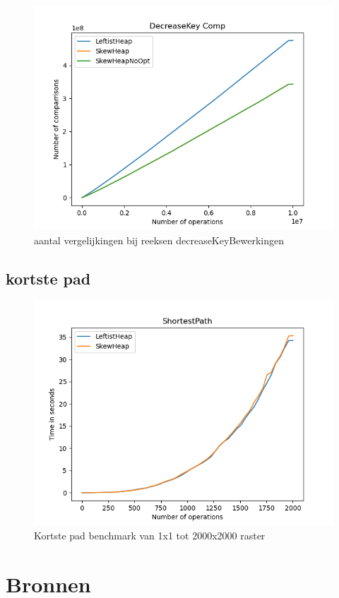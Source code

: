 \documentclass[10pt,a4paper,twoside]{article}
\begin{document}
\begin{figure}
    \centering
    \includegraphics[width=0.85\linewidth]{graphs/DecreaseKeyComp.png}
    \caption{aantal vergelijkingen bij reeksen decreaseKeyBewerkingen}
    \label{fig:decreaseKeyBenchComp}
\end{figure}

\subsection{kortste pad}
\begin{figure}[H]
    \centering
    \includegraphics[width=0.85\linewidth]{graphs/ShortestPath.png}
    \caption{Kortste pad benchmark van 1x1 tot 2000x2000 raster}
    \label{fig:shortestPathGraph}
\end{figure} 

\section{Bronnen}
\printbibliography
\end{document}
